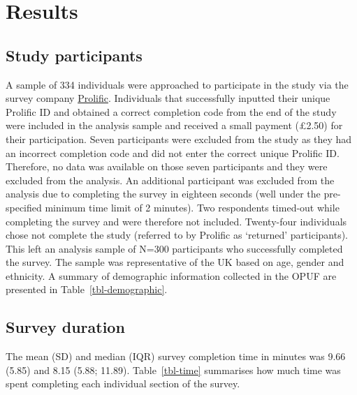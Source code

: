 \documentclass[
  number,
  preprint]{elsarticle}
\begin{document}
\section{Results}\label{results}

\subsection{Study participants}\label{study-participants}

A sample of 334 individuals were approached to participate in the study
via the survey company \href{https://www.prolific.com}{Prolific}.
Individuals that successfully inputted their unique Prolific ID and
obtained a correct completion code from the end of the study were
included in the analysis sample and received a small payment (£2.50) for
their participation. Seven participants were excluded from the study as
they had an incorrect completion code and did not enter the correct
unique Prolific ID. Therefore, no data was available on those seven
participants and they were excluded from the analysis. An additional
participant was excluded from the analysis due to completing the survey
in eighteen seconds (well under the pre-specified minimum time limit of
2 minutes). Two respondents timed-out while completing the survey and
were therefore not included. Twenty-four individuals chose not complete
the study (referred to by Prolific as `returned' participants). This
left an analysis sample of N=300 participants who successfully completed
the survey. The sample was representative of the UK based on age, gender
and ethnicity. A summary of demographic information collected in the
OPUF are presented in Table~\ref{tbl-demographic}.

\subsection{Survey duration}\label{survey-duration}

The mean (SD) and median (IQR) survey completion time in minutes was
9.66 (5.85) and 8.15 (5.88; 11.89). Table~\ref{tbl-time} summarises how
much time was spent completing each individual section of the survey.
\end{document}
